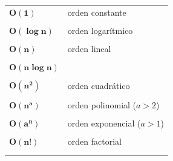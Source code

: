 \documentclass[twoside]{report}
\newcommand{\bs}[1]{\boldsymbol{#1}}
\begin{document}
        \begin{tabular}{ll}
              \vspace{-0.2cm}
            $\bs{O(1)}$ & orden constante \\ \\
              \vspace{-0.2cm}
            $\bs{O(\log n)}$ & orden logarítmico \\ \\
              \vspace{-0.2cm}
            $\bs{O(n)}$ & orden lineal \\ \\
              \vspace{-0.2cm}
            $\bs{O(n\log n)}$ &  \\ \\
              \vspace{-0.2cm}
            $\bs{O(n^2)}$ & orden cuadrático \\ \\
              \vspace{-0.2cm}
            $\bs{O(n^a)}$ & orden polinomial ($a>2$) \\ \\
              \vspace{-0.2cm}
            $\bs{O(a^n)}$ & orden exponencial ($a>1$) \\ \\
              \vspace{-0.2cm}
            $\bs{O(n!)}$ & orden factorial \\ \\
              \vspace{-0.2cm}
        \end{tabular}
\end{document}
